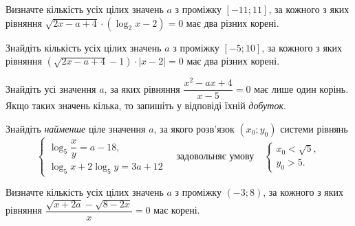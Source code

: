 \documentclass[12pt]{article}
\begin{document}
\begin{samepage}
\noindent\zadnum Визначте кількість усіх цілих значень $a$ з проміжку $[-11; 11]$, за кожного з яких рівняння $\sqrt{2x - a + 4} \cdot (\log_2 x - 2) = 0$ має два різних корені. 

\nmtnobreak
\nopagebreak\nbvspace{0.3cm}
\nmtAnswerBox
\par{}
\end{samepage}

\begin{samepage}
\noindent\zadnum Знайдіть кількість усіх цілих значень $a$ з проміжку $[-5; 10]$, за кожного з яких рівняння $(\sqrt{2x - a + 4} - 1) \cdot |x - 2| = 0$ має два різних корені. 

\nmtnobreak
\nopagebreak\nbvspace{0.3cm}
\nmtAnswerBox
\par{}
\end{samepage}

\begin{samepage}
\noindent\zadnum Знайдіть усі значення $a$, за яких рівняння $\dfrac{x^2 - ax + 4}{x - 5} = 0$ має лише один корінь. Якщо таких значень кілька, то запишіть у відповіді їхній \textit{добуток}. 

\nmtnobreak
\nopagebreak\nbvspace{0.3cm}
\nmtAnswerBox
\par{}
\end{samepage}

\begin{samepage}
\noindent\zadnum Знайдіть \textit{найменше} ціле значення $a$, за якого розв'язок $(x_0; y_0)$ системи рівнянь
$$
\begin{cases}
\log_5 \dfrac{x}{y} = a - 18, \\
\log_5 x + 2\log_5 y = 3a + 12
\end{cases}
\quad \text{задовольняє умову} \quad
\begin{cases}
x_0 < \sqrt{5}, \\
y_0 > 5.
\end{cases}
$$ 

\nmtnobreak
\nopagebreak\nbvspace{0.3cm}
\nmtAnswerBox
\par{}
\end{samepage}

\begin{samepage}
\noindent\zadnum Визначте кількість усіх цілих значень $a$ з проміжку $(-3; 8)$, за кожного з яких рівняння $\dfrac{\sqrt{x + 2a} - \sqrt{8 - 2x}}{x} = 0$ має корені. 

\nmtnobreak
\nopagebreak\nbvspace{0.3cm}
\nmtAnswerBox
\par{}
\end{samepage}
\end{document}
